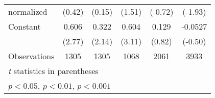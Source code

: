 \begin{table}[htbp]
\begin{tabular}{l*{5}{c}}
normalized                              &   (0.42)         &   (0.15)         &   (1.51)         &  (-0.72)         &  (-1.93)         \\
\addlinespace
Constant                                &    0.606\sym{**} &    0.322\sym{*}  &    0.604\sym{**} &    0.129         &  -0.0527         \\
                                        &   (2.77)         &   (2.14)         &   (3.11)         &   (0.82)         &  (-0.50)         \\
\midrule
Observations                            &     1305         &     1305         &     1068         &     2061         &     3933         \\
\bottomrule
\multicolumn{6}{l}{\footnotesize \textit{t} statistics in parentheses}\\
\multicolumn{6}{l}{\footnotesize \sym{*} \(p<0.05\), \sym{**} \(p<0.01\), \sym{***} \(p<0.001\)}\\
\end{tabular}
\end{table}
